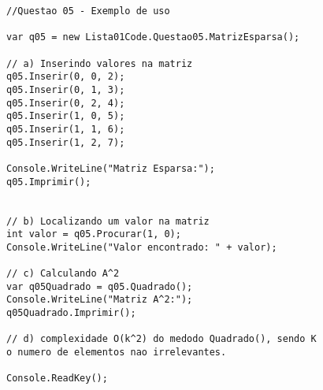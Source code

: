 \documentclass[portuguese,12pt,a4paper]{article}
\begin{document}
\begin{lstlisting}
//Questao 05 - Exemplo de uso

var q05 = new Lista01Code.Questao05.MatrizEsparsa();

// a) Inserindo valores na matriz
q05.Inserir(0, 0, 2);
q05.Inserir(0, 1, 3);
q05.Inserir(0, 2, 4);
q05.Inserir(1, 0, 5);
q05.Inserir(1, 1, 6);
q05.Inserir(1, 2, 7);

Console.WriteLine("Matriz Esparsa:");
q05.Imprimir();


// b) Localizando um valor na matriz
int valor = q05.Procurar(1, 0);
Console.WriteLine("Valor encontrado: " + valor);

// c) Calculando A^2
var q05Quadrado = q05.Quadrado();
Console.WriteLine("Matriz A^2:");
q05Quadrado.Imprimir();

// d) complexidade O(k^2) do medodo Quadrado(), sendo K 
o numero de elementos nao irrelevantes.

Console.ReadKey();

\end{lstlisting}
\end{document}

